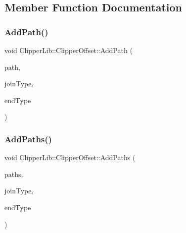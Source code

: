 \subsection{Member Function Documentation}
\mbox{\label{class_clipper_lib_1_1_clipper_offset_a0cd68e3690072f510924a5b25291043b}} 
\subsubsection{\texorpdfstring{AddPath()}{AddPath()}}
{\footnotesize\ttfamily void Clipper\+Lib\+::\+Clipper\+Offset\+::\+Add\+Path (\begin{DoxyParamCaption}\item[{const \mbox{\hyperlink{namespace_clipper_lib_af39c8fe00f278f18cc8142fef41242da}{Path}} \&}]{path,  }\item[{\mbox{\hyperlink{namespace_clipper_lib_ab3880a3ca1b45df3ce93ac315a74c06e}{Join\+Type}}}]{join\+Type,  }\item[{\mbox{\hyperlink{namespace_clipper_lib_abee78a365e96a6edf45e15f885568079}{End\+Type}}}]{end\+Type }\end{DoxyParamCaption})}

\mbox{\label{class_clipper_lib_1_1_clipper_offset_a18b35198f6370d76885af995ee2f16cb}} 
\subsubsection{\texorpdfstring{AddPaths()}{AddPaths()}}
{\footnotesize\ttfamily void Clipper\+Lib\+::\+Clipper\+Offset\+::\+Add\+Paths (\begin{DoxyParamCaption}\item[{const \mbox{\hyperlink{namespace_clipper_lib_a4bab1d9e10805fa6f1fd3b78c56efcfe}{Paths}} \&}]{paths,  }\item[{\mbox{\hyperlink{namespace_clipper_lib_ab3880a3ca1b45df3ce93ac315a74c06e}{Join\+Type}}}]{join\+Type,  }\item[{\mbox{\hyperlink{namespace_clipper_lib_abee78a365e96a6edf45e15f885568079}{End\+Type}}}]{end\+Type }\end{DoxyParamCaption})}

